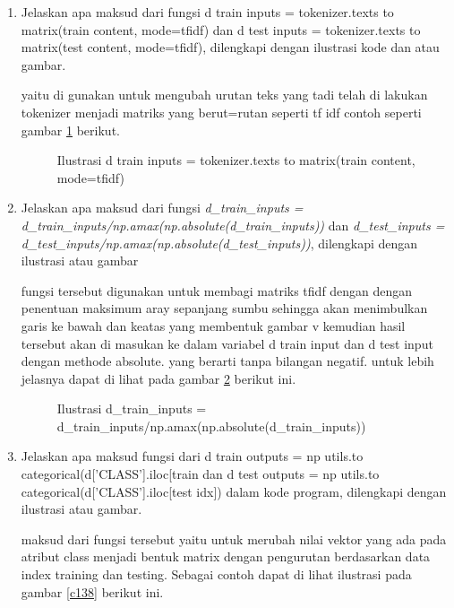 \begin{enumerate}
\item Jelaskan apa maksud dari fungsi d train inputs = tokenizer.texts to matrix(train content, mode=tfidf) dan d test inputs = tokenizer.texts to matrix(test content, mode=tfidf), dilengkapi dengan ilustrasi kode dan atau gambar.\par 
yaitu di gunakan untuk mengubah urutan teks yang tadi telah di lakukan tokenizer menjadi matriks yang berut=rutan seperti tf idf 
contoh seperti gambar \ref{c136} berikut.

\begin{figure}[!htbp]
      \caption{Ilustrasi d train inputs = tokenizer.texts to matrix(train content, mode=tfidf)}
      \label{c136}
      \end{figure}

\item Jelaskan apa maksud dari fungsi \emph{d\_train\_inputs = d\_train\_inputs/np.amax(np.absolute(d\_train\_inputs))} dan \emph{d\_test\_inputs = d\_test\_inputs/np.amax(np.absolute(d\_test\_inputs))}, dilengkapi dengan ilustrasi atau gambar \par

fungsi tersebut digunakan untuk membagi matriks tfidf dengan dengan penentuan maksimum aray sepanjang sumbu sehingga akan menimbulkan garis ke bawah dan keatas yang membentuk gambar v kemudian hasil tersebut akan di masukan ke dalam variabel d train input dan d test input dengan methode absolute. yang berarti tanpa bilangan negatif. untuk lebih jelasnya dapat di lihat pada gambar \ref{c137}  berikut ini.

\begin{figure}[!htbp]
      \caption{Ilustrasi d\_train\_inputs = d\_train\_inputs/np.amax(np.absolute(d\_train\_inputs))}
      \label{c137}
      \end{figure}

\item Jelaskan apa maksud fungsi dari d train outputs = np utils.to categorical(d['CLASS'].iloc[train dan d test outputs = np utils.to categorical(d['CLASS'].iloc[test idx]) dalam kode program, dilengkapi dengan ilustrasi atau gambar.\par

maksud dari fungsi tersebut yaitu untuk merubah nilai vektor yang ada pada atribut class menjadi bentuk matrix dengan pengurutan berdasarkan data index training dan testing. Sebagai contoh dapat di lihat ilustrasi pada gambar \ref{c138} berikut ini.


\end{enumerate}
